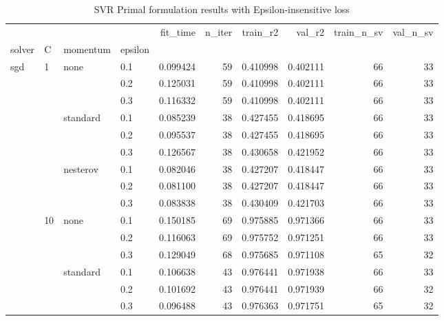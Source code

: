 \begin{table}[H]
\centering
\caption{SVR Primal formulation results with Epsilon-insensitive loss}
\label{primal_svr_eps_cv_results}
\begin{tabular}{llllrrrrrr}
\toprule
          &     &   &     &  fit\_time &  n\_iter &  train\_r2 &    val\_r2 &  train\_n\_sv &  val\_n\_sv \\
solver & C & momentum & epsilon &           &         &           &           &             &           \\
\midrule
sgd & 1   & none & 0.1 &  0.099424 &      59 &  0.410998 &  0.402111 &          66 &        33 \\
          &     &   & 0.2 &  0.125031 &      59 &  0.410998 &  0.402111 &          66 &        33 \\
          &     &   & 0.3 &  0.116332 &      59 &  0.410998 &  0.402111 &          66 &        33 \\
          &     & standard & 0.1 &  0.085239 &      38 &  0.427455 &  0.418695 &          66 &        33 \\
          &     &   & 0.2 &  0.095537 &      38 &  0.427455 &  0.418695 &          66 &        33 \\
          &     &   & 0.3 &  0.126567 &      38 &  0.430658 &  0.421952 &          66 &        33 \\
          &     & nesterov & 0.1 &  0.082046 &      38 &  0.427207 &  0.418447 &          66 &        33 \\
          &     &   & 0.2 &  0.081100 &      38 &  0.427207 &  0.418447 &          66 &        33 \\
          &     &   & 0.3 &  0.083838 &      38 &  0.430409 &  0.421703 &          66 &        33 \\
          & 10  & none & 0.1 &  0.150185 &      69 &  0.975885 &  0.971366 &          66 &        33 \\
          &     &   & 0.2 &  0.116063 &      69 &  0.975752 &  0.971251 &          66 &        33 \\
          &     &   & 0.3 &  0.129049 &      68 &  0.975685 &  0.971108 &          65 &        32 \\
          &     & standard & 0.1 &  0.106638 &      43 &  0.976441 &  0.971938 &          66 &        33 \\
          &     &   & 0.2 &  0.101692 &      43 &  0.976441 &  0.971939 &          66 &        32 \\
          &     &   & 0.3 &  0.096488 &      43 &  0.976363 &  0.971751 &          65 &        32 \\

\end{tabular}
\end{table}
